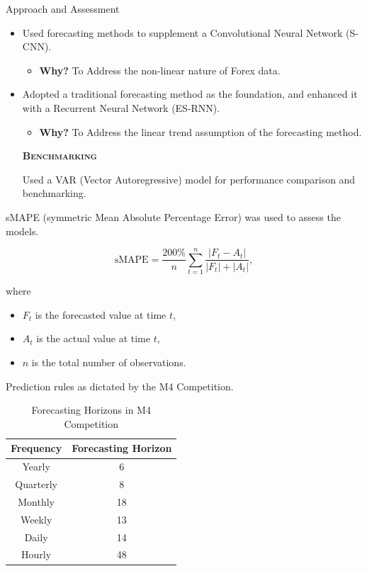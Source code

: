 \documentclass[aspectratio=169, 12pt]{beamer}
\begin{document}
\begin{frame}[allowframebreaks]{Approach and Assessment}

\begin{itemize}
        \item Used forecasting methods to supplement a Convolutional Neural Network (S-CNN).
        \begin{itemize}
            \item \textbf{Why?} To Address the non-linear nature of Forex data.
        \end{itemize}
        \item Adopted a traditional forecasting method as the foundation, and enhanced it with a Recurrent Neural Network (ES-RNN).
        \begin{itemize}
            \item \textbf{Why?} To Address the linear trend assumption of the forecasting method\cite{ayitey}.
        \end{itemize}

\begin{center}
    \textsc{\textbf{Benchmarking}}
\end{center}
        
Used a VAR (Vector Autoregressive) model for performance comparison and benchmarking.
\end{itemize}

sMAPE (symmetric Mean Absolute Percentage Error) was used to assess the models.

\begin{equation*}
\text{sMAPE} = \frac{200\%}{n} \sum_{t=1}^n \frac{|F_t - A_t|}{|F_t| + |A_t|},
\end{equation*}

where 
\begin{itemize}
    \item $F_t$ is the forecasted value at time $t$,
    \item $A_t$ is the actual value at time $t$,
    \item $n$ is the total number of observations.
\end{itemize}

Prediction rules as dictated by the M4 Competition\cite{m4}.

\begin{table}[h]
\centering
\caption{Forecasting Horizons in M4 Competition\cite{m4}}\label{tab:m4_horizons}
\begin{tabular}{cc}
\toprule
\textbf{Frequency} & \textbf{Forecasting Horizon} \\
\midrule
Yearly & 6 \\
Quarterly & 8 \\
Monthly & 18 \\
Weekly & 13 \\
Daily & 14 \\
Hourly & 48 \\
\bottomrule
\end{tabular}
\end{table}


\end{frame}
\end{document}

